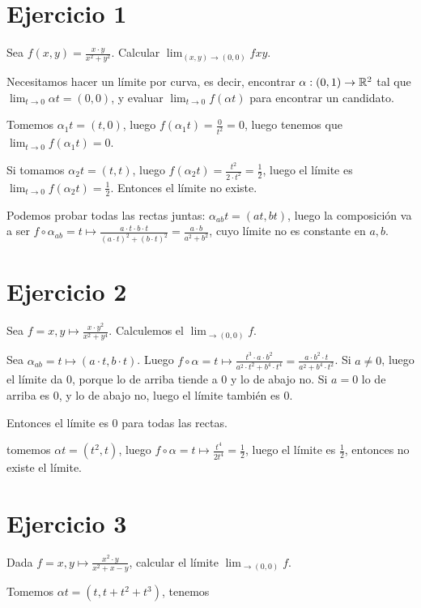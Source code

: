 \documentclass{article}
\begin{document}
\section{Ejercicio 1}
Sea $f(x, y) = \frac{x \cdot y}{x^2 + y^2} $.
Calcular $\lim_{(x, y) \to (0, 0)} fxy$.

Necesitamos hacer un límite por curva, es decir, encontrar
$\alpha : (0,1) \to \mathbb{R}^2$ tal que $\lim_{t \to 0} \alpha t = (0, 0)$, y evaluar
$\lim_{t \to 0} f(\alpha t)$ para encontrar un candidato.

Tomemos $\alpha_1 t = (t, 0)$, luego $f(\alpha_1 t) = \frac{0}{t^2} = 0$, luego tenemos
que $\lim_{t \to 0} f (\alpha_1 t) = 0$.

Si tomamos $\alpha_2 t = (t, t)$, luego $f(\alpha_2 t) = \frac{t^2}{2 \cdot t^2}
= \frac{1}{2}$,
luego el límite es $\lim_{t \to 0} f(\alpha_2 t) = \frac{1}{2} $.
Entonces el límite no existe.

Podemos probar todas las rectas juntas:
$\alpha_{ab}t = (at, bt)$, luego la composición va a ser $f \circ \alpha_{ab} =
t \mapsto \frac{a \cdot t \cdot b \cdot t}{(a \cdot t)^2 + (b \cdot t)^2} =
\frac{a \cdot b}{a^2 + b^2}$, cuyo límite no es constante en $a, b$.

\section{Ejercicio 2}
Sea $f = x,y \mapsto \frac{x \cdot y^2}{x^2 + y^4} $. Calculemos el
$\lim_{\to(0, 0)} f$.

Sea $\alpha_{ab} = t \mapsto (a \cdot t, b \cdot t)$. Luego
$f \circ \alpha = t \mapsto
\frac{t^3 \cdot a \cdot b^2}{a^2 \cdot t^2 + b^4 \cdot t^4}
= \frac{a \cdot b^2 \cdot t}{a^2 + b^4 \cdot t^2} $.
Si $a \neq 0$, luego el límite da $0$, porque lo de arriba tiende a $0$ y lo de abajo no.
Si $a = 0$ lo de arriba es $0$, y lo de abajo no, luego el límite también es $0$.

Entonces el límite es $0$ para todas las rectas.

tomemos $\alpha t = (t^2, t)$, luego $f \circ \alpha = t \mapsto \frac{t^4}{2t^4}
= \frac{1}{2} $, luego el límite es $\frac{1}{2} $, entonces no existe el límite.

\section{Ejercicio 3}
Dada $f = x,y \mapsto \frac{x^2 \cdot y}{x^2 + x - y}$, calcular el límite
$\lim_{\to(0,0)} f$.

Tomemos $\alpha t = (t, t + t^2 + t^3)$, tenemos
\end{document}
